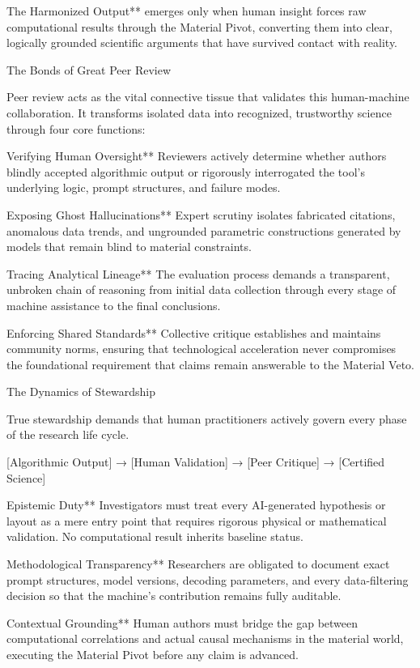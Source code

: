 The Harmonized Output** emerges only when human insight forces raw computational results through the Material Pivot, converting them into clear, logically grounded scientific arguments that have survived contact with reality.

The Bonds of Great Peer Review

Peer review acts as the vital connective tissue that validates this human-machine collaboration. It transforms isolated data into recognized, trustworthy science through four core functions:

Verifying Human Oversight**  
  Reviewers actively determine whether authors blindly accepted algorithmic output or rigorously interrogated the tool’s underlying logic, prompt structures, and failure modes.

Exposing Ghost Hallucinations**  
  Expert scrutiny isolates fabricated citations, anomalous data trends, and ungrounded parametric constructions generated by models that remain blind to material constraints.

Tracing Analytical Lineage**  
  The evaluation process demands a transparent, unbroken chain of reasoning from initial data collection through every stage of machine assistance to the final conclusions.

Enforcing Shared Standards**  
  Collective critique establishes and maintains community norms, ensuring that technological acceleration never compromises the foundational requirement that claims remain answerable to the Material Veto.

The Dynamics of Stewardship

True stewardship demands that human practitioners actively govern every phase of the research life cycle.

[Algorithmic Output] → [Human Validation] → [Peer Critique] → [Certified Science]

Epistemic Duty**  
  Investigators must treat every AI-generated hypothesis or layout as a mere entry point that requires rigorous physical or mathematical validation. No computational result inherits baseline status.

Methodological Transparency**  
  Researchers are obligated to document exact prompt structures, model versions, decoding parameters, and every data-filtering decision so that the machine’s contribution remains fully auditable.

Contextual Grounding**  
  Human authors must bridge the gap between computational correlations and actual causal mechanisms in the material world, executing the Material Pivot before any claim is advanced.

